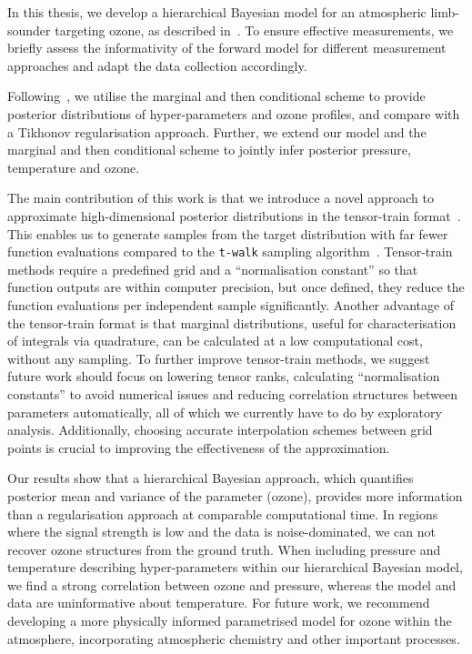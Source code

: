 In this thesis, we develop a hierarchical Bayesian model for an atmospheric limb-sounder targeting ozone, as described in~\cite{mipas2000handbook}.
To ensure effective measurements, we briefly assess the informativity of the forward model for different measurement approaches and adapt the data collection accordingly.

Following~\cite{fox2016fast}, we utilise the marginal and then conditional scheme to provide posterior distributions of hyper-parameters and ozone profiles, and compare with a Tikhonov regularisation approach.
Further, we extend our model and the marginal and then conditional scheme to jointly infer posterior pressure, temperature and ozone.

The main contribution of this work is that we introduce a novel approach to approximate high-dimensional posterior distributions in the tensor-train format~\cite{cui2022deep}.
This enables us to generate samples from the target distribution with far fewer function evaluations compared to the \texttt{t-walk} sampling algorithm~\cite{christen2010general}.
Tensor-train methods require a predefined grid and a ``normalisation constant'' so that function outputs are within computer precision, but once defined, they reduce the function evaluations per independent sample significantly.
Another advantage of the tensor-train format is that marginal distributions, useful for characterisation of integrals via quadrature, can be calculated at a low computational cost, without any sampling.
To further improve tensor-train methods, we suggest future work should focus on lowering tensor ranks, calculating ``normalisation constants'' to avoid numerical issues and reducing correlation structures between parameters automatically, all of which we currently have to do by exploratory analysis.
Additionally, choosing accurate interpolation schemes between grid points is crucial to improving the effectiveness of the approximation.

Our results show that a hierarchical Bayesian approach, which quantifies posterior mean and variance of the parameter (ozone), provides more information than a regularisation approach at comparable computational time.
In regions where the signal strength is low and the data is noise-dominated, we can not recover ozone structures from the ground truth.
When including pressure and temperature describing hyper-parameters within our hierarchical Bayesian model, we find a strong correlation between ozone and pressure, whereas the model and data are uninformative about temperature.
For future work, we recommend developing a more physically informed parametrised model for ozone within the atmosphere, incorporating atmospheric chemistry and other important processes.